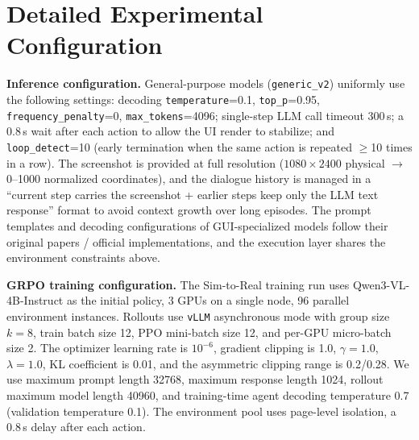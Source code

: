\documentclass{llmxive}
\begin{document}
\section{Detailed Experimental Configuration}\label{app:exp-config}

\textbf{Inference configuration.} General-purpose models (\texttt{generic\_v2}) uniformly use the following settings: decoding \texttt{temperature}=0.1, \texttt{top\_p}=0.95, \texttt{frequency\_penalty}=0, \texttt{max\_tokens}=4096; single-step LLM call timeout 300\,s; a 0.8\,s wait after each action to allow the UI render to stabilize; and \texttt{loop\_detect}=10 (early termination when the same action is repeated $\geq$10 times in a row). The screenshot is provided at full resolution ($1080 \times 2400$ physical $\to$ 0--1000 normalized coordinates), and the dialogue history is managed in a ``current step carries the screenshot + earlier steps keep only the LLM text response'' format to avoid context growth over long episodes. The prompt templates and decoding configurations of GUI-specialized models follow their original papers / official implementations, and the execution layer shares the environment constraints above.

\textbf{GRPO training configuration.} The Sim-to-Real training run uses Qwen3-VL-4B-Instruct as the initial policy, 3 GPUs on a single node, 96 parallel environment instances. Rollouts use \texttt{vLLM} asynchronous mode with group size $k=8$, train batch size 12, PPO mini-batch size 12, and per-GPU micro-batch size 2. The optimizer learning rate is $10^{-6}$, gradient clipping is 1.0, $\gamma=1.0$, $\lambda=1.0$, KL coefficient is 0.01, and the asymmetric clipping range is 0.2/0.28. We use maximum prompt length 32768, maximum response length 1024, rollout maximum model length 40960, and training-time agent decoding temperature 0.7 (validation temperature 0.1). The environment pool uses page-level isolation, a 0.8\,s delay after each action.
\end{document}

